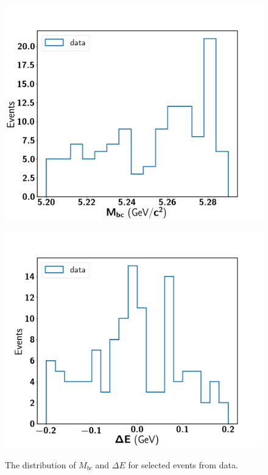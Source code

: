 \begin{figure}[H]
	\begin{minipage}[b]{0.5\linewidth}
		\centering 
		\includegraphics[width=1\linewidth]{figures/hist_stacked_data_mbc_ksfinder}
		\label{}
	\end{minipage}
	\begin{minipage}[b]{0.5\linewidth}
		\centering 
		\includegraphics[width=1\linewidth]{figures/hist_stacked_data_dE_ksfinder}
		\label{}
	\end{minipage}
	\caption{The distribution  of $M_{bc}$ and $\Delta E$ for selected events from data.}
	\label{fig:2Ddatastack}
\end{figure}

